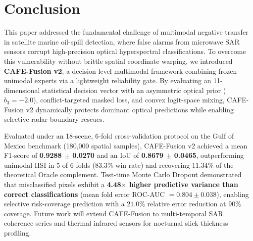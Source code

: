 \documentclass[conference]{IEEEtran}
\begin{document}
\section{Conclusion}
\label{sec:conclusion}

This paper addressed the fundamental challenge of multimodal negative transfer in satellite marine oil-spill detection, where false alarms from microwave SAR sensors corrupt high-precision optical hyperspectral classifications. To overcome this vulnerability without brittle spatial coordinate warping, we introduced \textbf{CAFE-Fusion v2}, a decision-level multimodal framework combining frozen unimodal experts via a lightweight reliability gate. By evaluating an 11-dimensional statistical decision vector with an asymmetric optical prior ($b_3 = -2.0$), conflict-targeted masked loss, and convex logit-space mixing, CAFE-Fusion v2 dynamically protects dominant optical predictions while enabling selective radar boundary rescues.

Evaluated under an 18-scene, 6-fold cross-validation protocol on the Gulf of Mexico benchmark (180,000 spatial samples), CAFE-Fusion v2 achieved a mean F1-score of \textbf{0.9288 $\pm$ 0.0270} and an IoU of \textbf{0.8679 $\pm$ 0.0465}, outperforming unimodal HSI in 5 of 6 folds ($83.3\%$ win rate) and recovering $11.34\%$ of the theoretical Oracle complement. Test-time Monte Carlo Dropout demonstrated that misclassified pixels exhibit a \textbf{4.48$\times$ higher predictive variance than correct classifications} (mean fold error ROC-AUC $= 0.804 \pm 0.038$), enabling selective risk-coverage prediction with a $21.0\%$ relative error reduction at $90\%$ coverage. Future work will extend CAFE-Fusion to multi-temporal SAR coherence series and thermal infrared sensors for nocturnal slick thickness profiling.

\begingroup
\renewcommand{\IEEEbibitemsep}{0.3pt plus 0.3pt}
\def\BIBdecl{\footnotesize}


\endgroup
\end{document}
